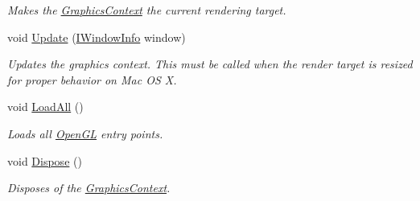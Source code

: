 \begin{DoxyCompactItemize}
\begin{DoxyCompactList}\small\item\em Makes the \hyperlink{class_open_t_k_1_1_graphics_1_1_graphics_context}{Graphics\-Context} the current rendering target. \end{DoxyCompactList}\item 
void \hyperlink{class_open_t_k_1_1_graphics_1_1_graphics_context_a09fa035789147f9b9cfe2a5f09abe927}{Update} (\hyperlink{interface_open_t_k_1_1_platform_1_1_i_window_info}{I\-Window\-Info} window)
\begin{DoxyCompactList}\small\item\em Updates the graphics context. This must be called when the render target is resized for proper behavior on Mac O\-S X. \end{DoxyCompactList}\item 
void \hyperlink{class_open_t_k_1_1_graphics_1_1_graphics_context_a21640f20db040987bd1f897f503b68a4}{Load\-All} ()
\begin{DoxyCompactList}\small\item\em Loads all \hyperlink{namespace_open_t_k_1_1_graphics_1_1_open_g_l}{Open\-G\-L} entry points. \end{DoxyCompactList}\item 
void \hyperlink{class_open_t_k_1_1_graphics_1_1_graphics_context_a10e5f7c2e87670fd7400d8e4259fc602}{Dispose} ()
\begin{DoxyCompactList}\small\item\em Disposes of the \hyperlink{class_open_t_k_1_1_graphics_1_1_graphics_context}{Graphics\-Context}. \end{DoxyCompactList}\end{DoxyCompactItemize}
